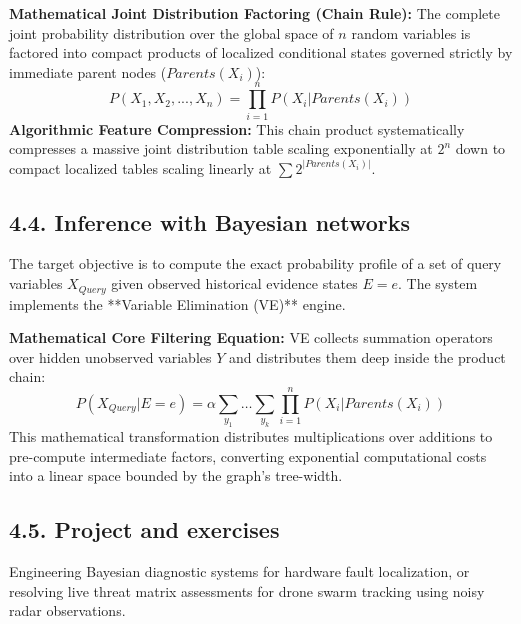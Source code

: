 \documentclass[../main.tex]{subfiles}
\begin{document}
\textbf{Mathematical Joint Distribution Factoring (Chain Rule):} The complete joint probability distribution over the global space of $n$ random variables is factored into compact products of localized conditional states governed strictly by immediate parent nodes ($Parents(X_i)$):
\begin{equation}
    P(X_1, X_2, ..., X_n) = \prod_{i=1}^{n} P(X_i | Parents(X_i))
\end{equation}
\textbf{Algorithmic Feature Compression:} This chain product systematically compresses a massive joint distribution table scaling exponentially at $2^n$ down to compact localized tables scaling linearly at $\sum 2^{|Parents(X_i)|}$.

\subsection{4.4. Inference with Bayesian networks}
The target objective is to compute the exact probability profile of a set of query variables $X_{Query}$ given observed historical evidence states $E = e$. The system implements the **Variable Elimination (VE)** engine.

\textbf{Mathematical Core Filtering Equation:} VE collects summation operators over hidden unobserved variables $Y$ and distributes them deep inside the product chain:
\begin{equation}
    P(X_{Query} | E = e) = \alpha \sum_{y_1} \dots \sum_{y_k} \prod_{i=1}^{n} P(X_i | Parents(X_i))
\end{equation}
This mathematical transformation distributes multiplications over additions to pre-compute intermediate factors, converting exponential computational costs into a linear space bounded by the graph's tree-width.

\subsection{4.5. Project and exercises}
Engineering Bayesian diagnostic systems for hardware fault localization, or resolving live threat matrix assessments for drone swarm tracking using noisy radar observations.
\end{document}
